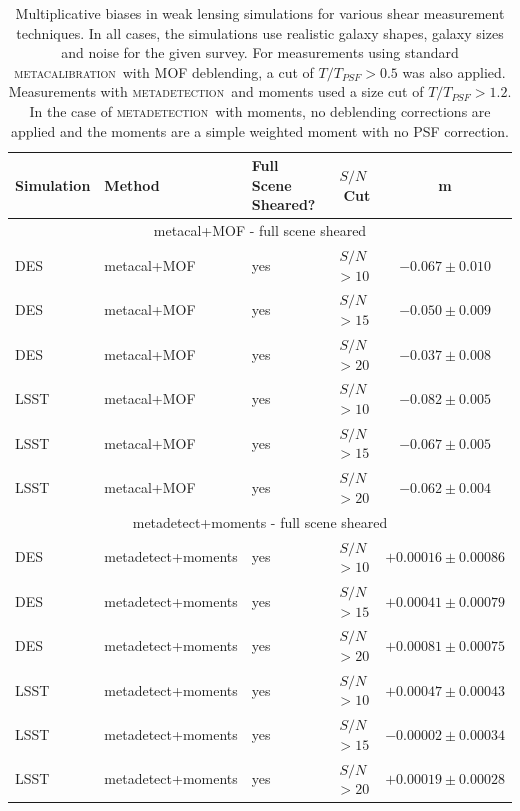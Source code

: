 \documentclass[fleqn,useAMS,usenatbib]{mnras}
\newcommand{\snr}{$S/N$}
\newcommand{\mcal}{\textsc{metacalibration}}
\newcommand{\mdet}{\textsc{metadetection}}
\begin{document}
\begin{table}
  \centering
  \caption{
    Multiplicative biases in weak lensing simulations for various shear
    measurement techniques. In all cases, the simulations use realistic
    galaxy shapes, galaxy sizes and noise for the given survey. For measurements using standard \mcal\ with
    MOF deblending, a cut of $T/T_{PSF} > 0.5$ was also applied. Measurements with
    \mdet\ and moments used a size cut of $T/T_{PSF} > 1.2$. In the case of \mdet\ with moments,
    no deblending corrections are applied and the moments are a simple weighted moment
    with no PSF correction.}
  \label{tab:shearmeas}

  \begin{tabular}{|l|l|l|c|c|}
    \hline
    Simulation & Method & Full Scene Sheared? & \snr\ Cut & m \\
    \hline

    \hline
    \multicolumn{5}{c}{metacal+MOF - full scene sheared}\\
    \hline
    DES   & metacal+MOF & yes & \snr$ > 10$ & $-0.067 \pm 0.010$  \\
    DES   & metacal+MOF & yes & \snr$ > 15$ & $-0.050 \pm 0.009$  \\
    DES   & metacal+MOF & yes & \snr$ > 20$ & $-0.037 \pm 0.008$  \\
    \hline
    LSST  & metacal+MOF & yes & \snr$ > 10$ & $-0.082 \pm 0.005$  \\
    LSST  & metacal+MOF & yes & \snr$ > 15$ & $-0.067 \pm 0.005$  \\
    LSST  & metacal+MOF & yes & \snr$ > 20$ & $-0.062 \pm 0.004$  \\
    \hline

    \hline
    \multicolumn{5}{c}{metadetect+moments - full scene sheared}\\
    \hline
    DES   & metadetect+moments & yes & \snr$ > 10$ & $+0.00016 \pm 0.00086$  \\
    DES   & metadetect+moments & yes & \snr$ > 15$ & $+0.00041 \pm 0.00079$  \\
    DES   & metadetect+moments & yes & \snr$ > 20$ & $+0.00081 \pm 0.00075$  \\
    \hline
    LSST  & metadetect+moments & yes & \snr$ > 10$ & $+0.00047 \pm 0.00043$  \\
    LSST  & metadetect+moments & yes & \snr$ > 15$ & $-0.00002 \pm 0.00034$  \\
    LSST  & metadetect+moments & yes & \snr$ > 20$ & $+0.00019 \pm 0.00028$  \\
    \hline


\end{tabular}
\end{table}
\end{document}
